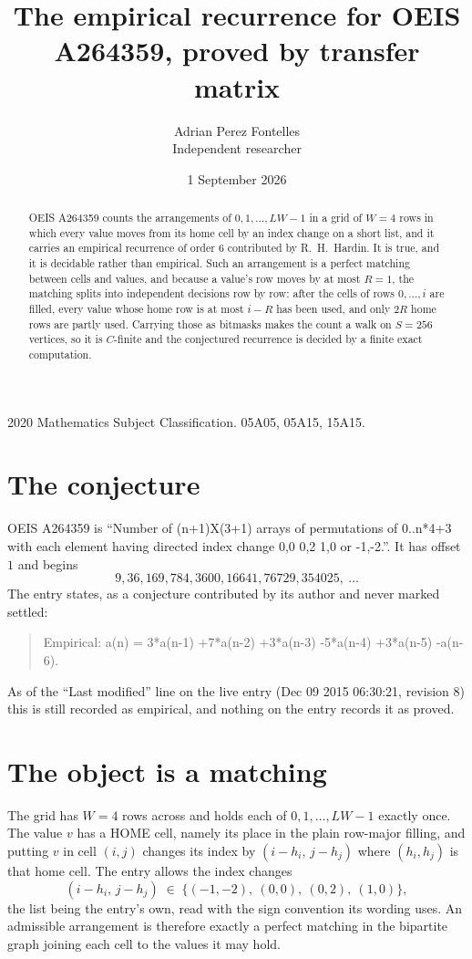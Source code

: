 \documentclass[11pt,a4paper]{article}
\title{The empirical recurrence for OEIS A264359, proved by transfer matrix}
\author{Adrian Perez Fontelles\\ \small Independent researcher}
\date{1 September 2026}
\theoremstyle{plain}
\theoremstyle{definition}
\begin{document}
\maketitle

\begin{abstract}
OEIS A264359 counts the arrangements of $0,1,\dots,LW-1$ in a grid of $W=4$ rows in which
every value moves from its home cell by an index change on a short list, and it carries an
empirical recurrence of order $6$ contributed by R.~H.~Hardin. It is true, and it is
decidable rather than empirical. Such an arrangement is a perfect matching between cells and
values, and because a value's row moves by at most $R=1$, the matching splits into
independent decisions row by row: after the cells of rows $0,\dots,i$ are filled,
every value whose home row is at most $i-R$ has been used, and only $2R$ home rows are
partly used. Carrying those as bitmasks makes the count a walk on $S=256$ vertices, so it is
$C$-finite and the conjectured recurrence is decided by a finite exact computation.
\end{abstract}

\noindent\small 2020 Mathematics Subject Classification. 05A05, 05A15, 15A15.\normalsize

\section{The conjecture}

OEIS A264359 is ``Number of (n+1)X(3+1) arrays of permutations of 0..n*4+3 with each element having directed index change 0,0 0,2 1,0 or -1,-2.''. It has offset $1$ and begins
\[
9, 36, 169, 784, 3600, 16641, 76729, 354025,\ \dots
\]
The entry states, as a conjecture contributed by its author and never marked settled:
\begin{quote}
Empirical: a(n) = 3*a(n-1) +7*a(n-2) +3*a(n-3) -5*a(n-4) +3*a(n-5) -a(n-6).
\end{quote}
As of the ``Last modified'' line on the live entry (Dec 09 2015 06:30:21, revision 8) this is still
recorded as empirical, and nothing on the entry records it as proved.

\section{The object is a matching}

The grid has $W=4$ rows across and holds each of $0,1,\dots,LW-1$ exactly once. The value
$v$ has a HOME cell, namely its place in the plain row-major filling, and putting $v$ in cell
$(i,j)$ changes its index by $(i-h_i,\,j-h_j)$ where $(h_i,h_j)$ is that home cell. The entry
allows the index changes
\[
(i-h_i,\,j-h_j)\;\in\;\{(-1,-2),\ (0,0),\ (0,2),\ (1,0)\},
\]
the list being the entry's own, read with the sign convention its wording uses. An admissible
arrangement is therefore exactly a perfect matching in the bipartite graph joining each cell to
the values it may hold.
\end{document}
